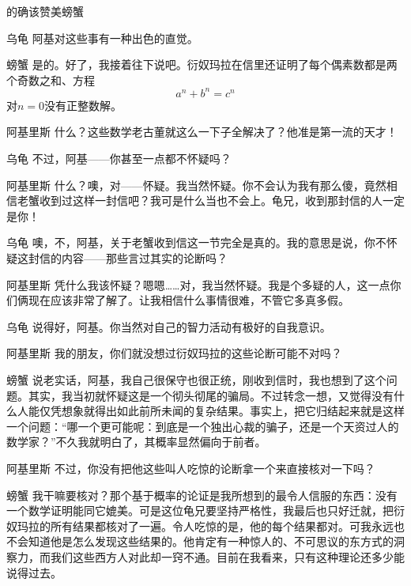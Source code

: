 \begin{dialog}{的确该赞美螃蟹}
\begin{dialogue}
\item[乌龟]阿基对这些事有一种出色的直觉。

\item[螃蟹]是的。好了，我接着往下说吧。衍奴玛拉在信里还证明了每个偶素数都是两个奇数之和、方程
\[
  a^n+b^n=c^n
\]
对$n=0$没有正整数解。

\item[阿基里斯]什么？这些数学老古董就这么一下子全解决了？他准是第一流的天才！

\item[乌龟]不过，阿基——你甚至一点都不怀疑吗？

\item[阿基里斯]什么？噢，对——怀疑。我当然怀疑。你不会认为我有那么傻，竟然相信老蟹收到过这样一封信吧？我可是什么当也不会上。龟兄，收到那封信的人一定是你！

\item[乌龟]噢，不，阿基，关于老蟹收到信这一节完全是真的。我的意思是说，你不怀疑这封信的内容——那些言过其实的论断吗？

\item[阿基里斯]凭什么我该怀疑？嗯嗯……对，我当然怀疑。我是个多疑的人，这一点你们俩现在应该非常了解了。让我相信什么事情很难，不管它多真多假。

\item[乌龟]说得好，阿基。你当然对自己的智力活动有极好的自我意识。

\item[阿基里斯]我的朋友，你们就没想过衍奴玛拉的这些论断可能不对吗？

\item[螃蟹]说老实话，阿基，我自己很保守也很正统，刚收到信时，我也想到了这个问题。其实，我当初就怀疑这是一个彻头彻尾的骗局。不过转念一想，又觉得没有什么人能仅凭想象就得出如此前所未闻的复杂结果。事实上，把它归结起来就是这样一个问题：“哪一个更可能呢：到底是一个独出心裁的骗子，还是一个天资过人的数学家？”不久我就明白了，其概率显然偏向于前者。

\item[阿基里斯]不过，你没有把他这些叫人吃惊的论断拿一个来直接核对一下吗？

\item[螃蟹]我干嘛要核对？那个基于概率的论证是我所想到的最令人信服的东西：没有一个数学证明能同它媲美。可是这位龟兄要坚持严格性，我最后也只好迁就，把衍奴玛拉的所有结果都核对了一遍。令人吃惊的是，他的每个结果都对。可我永远也不会知道他是怎么发现这些结果的。他肯定有一种惊人的、不可思议的东方式的洞察力，而我们这些西方人对此却一窍不通。目前在我看来，只有这种理论还多少能说得过去。


\end{dialogue}
\end{dialog}
